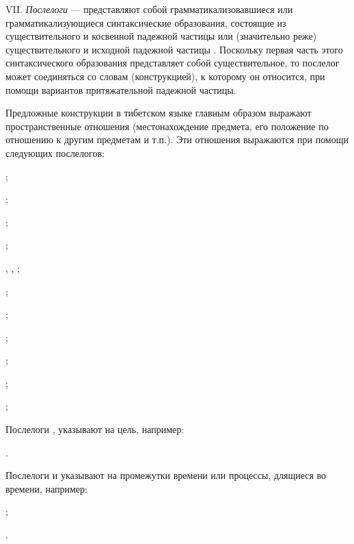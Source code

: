 VII. \emph{Послелоги} --- представляют собой грамматикализовавшиеся или грамматикализующиеся синтаксические образования, состоящие из существительного и косвенной падежной частицы или (значительно реже) существительного и исходной падежной частицы . Поскольку первая часть этого синтаксического образования представляет собой существительное, то послелог может соединяться со словам (конструкцией), к которому он относится, при помощи вариантов притяжательной падежной частицы.

Предложные конструкции в тибетском языке главным образом выражают пространственные отношения (местонахождение предмета, его положение по отношению к другим предметам и т.п.). Эти отношения выражаются при помощи следующих послелогов:
\begin{prfsample}
	\item {};
	\item {};
	\item {};
	\item {};
	\item {}, , ;
	\item {};
	\item {};
	\item {};
	\item {};
	\item {};
	\item {};
\end{prfsample}

Послелоги ,  указывают на цель, например:
\begin{prfsample}
	\item {}.
\end{prfsample}

Послелоги  и  указывают на промежутки времени или процессы, длящиеся во времени, например:
\begin{prfsample}
	\item {};
	\item {}.
\end{prfsample}

